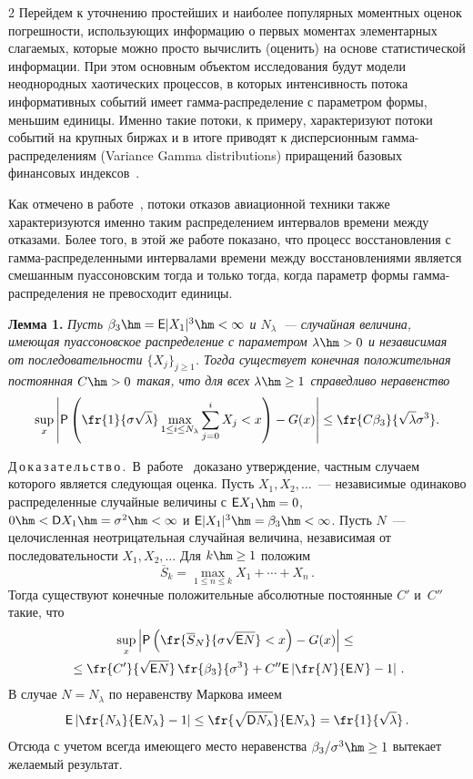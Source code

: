 \begin{multicols}{2}
Перейдем к уточнению простейших и наиболее популярных моментных
оценок погрешности, использующих информацию о первых моментах
элементарных слагаемых, которые можно просто вычислить (оценить) на
основе статистической информации. При этом основным объектом
исследования будут модели неоднородных хаотических процессов, в
которых интенсивность потока информативных событий имеет
гам\-ма-рас\-пре\-де\-ле\-ние с параметром формы, меньшим единицы. Именно
такие потоки, к примеру, характеризуют потоки событий на крупных
биржах и в итоге приводят к дисперсионным гам\-ма-рас\-пре\-де\-ле\-ни\-ям
(Variance Gamma distributions) приращений базовых финансовых
индексов~\cite{KorolevSokolov2012}. 

Как отмечено в работе~\cite{Gleser1987}, 
потоки отказов авиационной техники также
характеризуются именно таким распределением интервалов времени между
отказами. Более того, в этой же работе показано, что процесс
восстановления с гам\-ма-рас\-пре\-де\-лен\-ны\-ми интервалами времени между
восстановлениями является смешанным пуассоновским тогда и только
тогда, когда параметр формы гам\-ма-рас\-пре\-де\-ле\-ния не превосходит
единицы.

\smallskip

\noindent
\textbf{Лемма 1.} \textit{Пусть $\beta_3\hm={\sf E}|X_1|^3\hm<\infty$ и
$N_{\lambda}$~--- случайная величина, имеющая пуассоновское
распределение с параметром $\lambda \hm>0$ и независимая от
последовательности $\{X_j\}_{j\ge 1}$. Тогда существует конечная
положительная постоянная $C\hm>0$ такая, что для всех $\lambda \hm\ge 1$
справедливо неравенство}
$$
\sup\limits_{x} \left\vert{\sf P}\left(\fr{1}{\sigma\sqrt{\lambda}}
\max\limits_{1\le i\le N_{\lambda}}\sum\limits_{j=0}^{i}
X_j<x\right)-G(x)\right\vert \le
\fr{C\beta_3}{\sqrt{\lambda}\sigma^3}.
$$

\smallskip

\noindent
Д\,о\,к\,а\,з\,а\,т\,е\,л\,ь\,с\,т\,в\,о\,.\ В~работе~\cite{KorolevSelivanova1995}
доказано утверждение, частным случаем которого является следующая
оценка. Пусть $X_1,X_2,\ldots$~--- независимые одинаково
распределенные случайные величины с ${\sf E}X_1\hm=0$, $0\hm<{\sf
D}X_1\hm=\sigma^2\hm<\infty$ и ${\sf E}|X_1|^3\hm=\beta_3\hm<\infty$. Пусть $N$~--- 
целочисленная неотрицательная случайная величина, независимая от
последовательности $X_1,X_2,\ldots$ Для $k\hm\ge 1$ положим 
$$
\overline
S_k=\max\limits_{1\le n\le k}X_1+ \cdots+X_n\,.
$$ 
Тогда существуют конечные
положительные абсолютные постоянные $C'$ и~$C''$ такие, что
\begin{multline*}
\sup\limits_x \left\vert{\sf P}\left(\fr{\overline S_N}{\sigma\sqrt{{\sf
E}N}}< x\right)-G(x)\right\vert\le{}\\
{}\le\fr{C'}{\sqrt{{\sf
E}N}}\,\fr{\beta_3}{\sigma^3}+ C''{\sf E}\left\vert\fr{N}{{\sf
E}N}-1\right\vert\,.
\end{multline*}
В случае $N=N_{\lambda}$ по неравенству Маркова имеем
$$
{\sf E}\left\vert\fr{N_{\lambda}}{{\sf
E}N_{\lambda}}-1\right\vert\le\fr {\sqrt{{\sf D}N_{\lambda}}}{{\sf
E}N_{\lambda}}=\fr{1}{\sqrt{\lambda}}\,.
$$
Отсюда с учетом всегда имеющего место неравенства
$\beta_3/\sigma^3\hm\ge 1$ вытекает желаемый результат.


\end{multicols}
